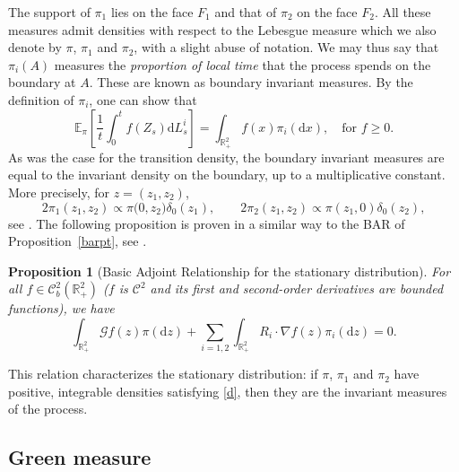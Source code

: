 \documentclass[11pt]{article}
\newtheorem{prop}[thm]{Proposition}
\theoremstyle{definition}
\begin{document}
The support of $\pi_1$ lies on the face $F_1$ and that of $\pi_2$ on the face $F_2$. All these measures admit densities with respect to the Lebesgue measure which we also denote by $\pi$, $\pi_1$ and $\pi_2$, with a slight abuse of notation.
We may thus say that $\pi_i (A)$ measures the \textit{proportion of local time} that the process spends on the boundary at $A$. These are known as boundary invariant measures.
By the definition of $\pi_i$, one can show that
\begin{equation}
\label{intro:eq:invbordformule}
\mathbb{E}_{\pi} \left[ \frac{1}{t} \int_0^t f(Z_s) \mathrm{d}L_s^i  \right]= \int_{\mathbb{R}_+^2} f(x) \pi_i (\mathrm{d} x), \quad \text{for } f\geqslant 0.
\end{equation}
As was the case for the transition density, the boundary invariant measures are equal to the invariant density on the boundary, up to a multiplicative constant. More precisely, for $z=(z_1,z_2)$,
\[
2 \pi_1(z_1,z_2)\propto \pi\bigl(0,z_2) \delta_0(z_1),
\qquad
2 \pi_2(z_1,z_2)\propto \pi(z_1,0) \delta_0(z_2) ,
\]
see \cite[Section 2.2]{franceschi_bousquet_melou_price_hardouin_raschel_stationary_2023}.
The following proposition is proven in a similar way to the BAR of Proposition~\ref{barpt}, see \cite{harrison_brownian_1987,dai_reflected_1992}.
\begin{prop}[Basic Adjoint Relationship for the stationary distribution]
\label{prop:bar}
For all $f \in \mathcal{C}^2_b (\mathbb{R}_+^2)$ ($f$ is $\mathcal{C}^2$ and its first and
second-order derivatives are bounded functions), we have
\begin{equation} \label{d} \int_{\mathbb{R}_+^2} \mathcal{G} f(z) \pi (\mathrm{d} z) + \sum_{i=1,2} \int_{\mathbb{R}_+^2} R_i \cdot \nabla f(z) \pi_i (\mathrm{d} z) =0 .
\end{equation}
\end{prop} 
This relation characterizes the stationary distribution: if $\pi$, $\pi_1$ and $\pi_2$ have positive, integrable densities satisfying \eqref{d}, then they are the invariant measures of the process.


\subsection{Green measure}
\label{subsec:green125}
\end{document}
